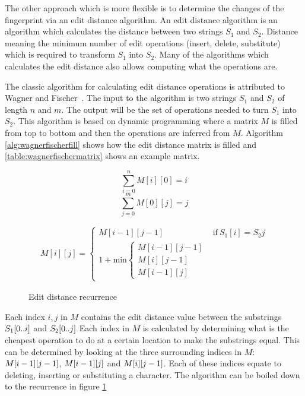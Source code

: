 The other approach which is more flexible is to determine the changes of the fingerprint
via an edit distance algorithm. An edit distance algorithm is an algorithm which
calculates the distance between two strings $S_1$ and $S_2$. Distance meaning the minimum
number of edit operations (insert, delete, substitute) which is required to transform $S_1$
into $S_2$. Many of the algorithms which calculates the edit distance also allows
computing what the operations are.

The classic algorithm for calculating edit distance operations is attributed to Wagner and
Fischer~\cite{WagnerFischer}. The input to the algorithm is two strings $S_1$ and $S_2$ of
length $n$ and $m$. The output will be the set of operations needed to turn $S_1$ into
$S_2$. This algorithm is based on dynamic programming where a matrix $M$ is filled from
top to bottom and then the operations are inferred from $M$. Algorithm
\ref{alg:wagnerfischerfill} shows how the edit distance matrix is filled and
\ref{table:wagnerfischermatrix} shows an example matrix.

\begin{figure}[t]
    \begin{center}
	$$
		\sum^{n}_{i = 0}{M[i][0] = i}
	$$
	$$
		\sum^{m}_{j = 0}{M[0][j] = j}
	$$

	\begin{gather*}
		M[i][j] =
		\begin{cases}
			M[i-1][j-1] & \mathrm{if\ } S_1[i] = S_2{j} \\
			1 + \mathrm{min}
			\begin{cases}
				M[i-1][j-1] \\
				M[i][j-1]   \\
				M[i-1][j]
			\end{cases}
		\end{cases}
	\end{gather*}
	\caption{Edit distance recurrence}
	\label{eq:editdistancerecurrence}
    \end{center}
\end{figure}

Each index $i, j$ in $M$ contains the edit distance value between the substrings
$S_1[{0..i}]$ and $S_2[{0..j}]$ Each index in $M$ is calculated by
determining what is the cheapest operation to do at a certain location to make the
substrings equal. This can be determined by looking at the three surrounding indices in
$M$: $M[{i - 1}][{j - 1}]$, $M[{i - 1}][{j}]$ and
$M[{i}][{j - 1}]$. Each of these indices equate to deleting, inserting or
substituting a character. The algorithm can be boiled down to the recurrence in figure
\ref{eq:editdistancerecurrence}


